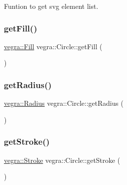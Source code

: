 Funtion to get svg element list. 

\mbox{\label{structvegra_1_1Circle_a8f68bc2e3f0469a479d5314b81aeffc8}} 
\subsubsection{\texorpdfstring{get\+Fill()}{getFill()}}
{\footnotesize\ttfamily \mbox{\hyperlink{structvegra_1_1Fill}{vegra\+::\+Fill}} vegra\+::\+Circle\+::get\+Fill (\begin{DoxyParamCaption}{ }\end{DoxyParamCaption})\hspace{0.3cm}{\ttfamily [inline]}}

\mbox{\label{structvegra_1_1Circle_ad9eb941c53b548d6944e8d95f9ff1328}} 
\subsubsection{\texorpdfstring{get\+Radius()}{getRadius()}}
{\footnotesize\ttfamily \mbox{\hyperlink{structvegra_1_1Radius}{vegra\+::\+Radius}} vegra\+::\+Circle\+::get\+Radius (\begin{DoxyParamCaption}{ }\end{DoxyParamCaption})\hspace{0.3cm}{\ttfamily [inline]}}

\mbox{\label{structvegra_1_1Circle_ab0ab83cb024a9b236c87194fdada9055}} 
\subsubsection{\texorpdfstring{get\+Stroke()}{getStroke()}}
{\footnotesize\ttfamily \mbox{\hyperlink{structvegra_1_1Stroke}{vegra\+::\+Stroke}} vegra\+::\+Circle\+::get\+Stroke (\begin{DoxyParamCaption}{ }\end{DoxyParamCaption})\hspace{0.3cm}{\ttfamily [inline]}}

